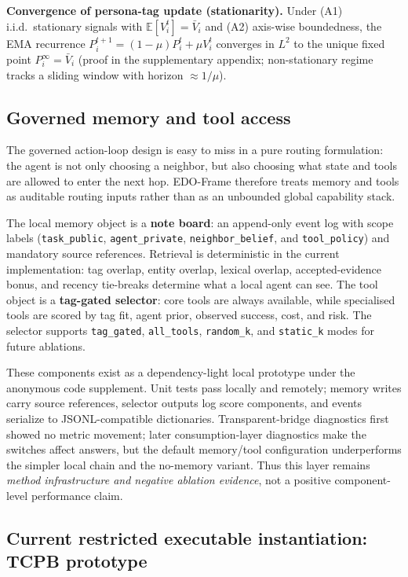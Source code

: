 \documentclass[11pt]{article}
\begin{document}
\textbf{Convergence of persona-tag update (stationarity).} Under (A1) i.i.d.\ stationary signals with $\mathbb{E}[V_i^t]{=}\bar V_i$ and (A2) axis-wise boundedness, the EMA recurrence $P_i^{t+1}{=}(1{-}\mu)P_i^t{+}\mu V_i^t$ converges in $L^2$ to the unique fixed point $P_i^\infty{=}\bar V_i$ (proof in the supplementary appendix; non-stationary regime tracks a sliding window with horizon $\approx 1/\mu$).

\subsection{Governed memory and tool access}
\label{sec:memory-tools}

The governed action-loop design is easy to miss in a pure routing formulation: the agent is not only choosing a neighbor, but also choosing what state and tools are allowed to enter the next hop. EDO-Frame therefore treats memory and tools as auditable routing inputs rather than as an unbounded global capability stack.

The local memory object is a \textbf{note board}: an append-only event log with scope labels (\texttt{task\_public}, \texttt{agent\_private}, \texttt{neighbor\_belief}, and \texttt{tool\_policy}) and mandatory source references. Retrieval is deterministic in the current implementation: tag overlap, entity overlap, lexical overlap, accepted-evidence bonus, and recency tie-breaks determine what a local agent can see. The tool object is a \textbf{tag-gated selector}: core tools are always available, while specialised tools are scored by tag fit, agent prior, observed success, cost, and risk. The selector supports \texttt{tag\_gated}, \texttt{all\_tools}, \texttt{random\_k}, and \texttt{static\_k} modes for future ablations.

These components exist as a dependency-light local prototype under the anonymous code supplement. Unit tests pass locally and remotely; memory writes carry source references, selector outputs log score components, and events serialize to JSONL-compatible dictionaries. Transparent-bridge diagnostics first showed no metric movement; later consumption-layer diagnostics make the switches affect answers, but the default memory/tool configuration underperforms the simpler local chain and the no-memory variant. Thus this layer remains \emph{method infrastructure and negative ablation evidence}, not a positive component-level performance claim.

\subsection{Current restricted executable instantiation: TCPB prototype}
\end{document}
